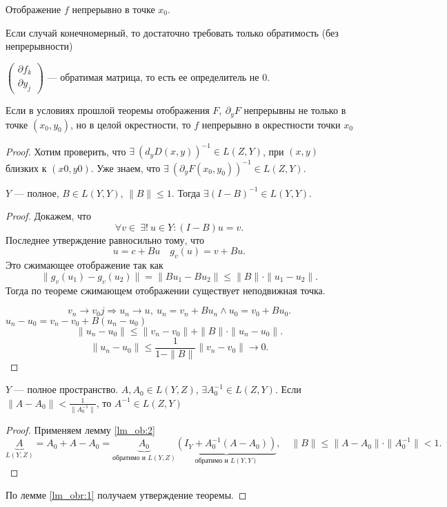 \documentclass[11pt,dvipsnames]{report}
\begin{document}
\begin{note}
    Отображение $ f$ непрерывно в точке $ x_0$.
\end{note}
\begin{note}
    Если случай конечномерный, то достаточно требовать только обратимость (без непрерывности)
\end{note}
\begin{note}
    $
    \begin{pmatrix}
        \partial f_k \\ \partial y_j
    \end{pmatrix}
    $ --- обратимая матрица,  то есть ее определитель не 0.
\end{note}
\begin{thm}
    Если в условиях прошлой теоремы отображения  $ F, ~\partial _yF$ непрерывны не только в точке $ (x_0, y_0)$, но в целой окрестности, то $ f$  непрерывно в окрестности точки  $ x_0$
\end{thm}
\begin{proof}
    Хотим проверить, что $ \exists ~ (d_y D(x, y))^{-1} \in L(Z, Y)$, при $ (x, y)$ близких к $ (x0, y0)$. Уже знаем, что $ \exists ~\left( \partial _yF(x_0, y_0) \right)^{-1} \in L(Z, Y)$.
    \begin{lm}\label{lm_ob:2}
	$ Y$ --- полное,  $ B \in L(Y, Y)$, $ \| B \|  \le  1 $. Тогда $ \exists ( I - B)^{-1} \in L(Y, Y)$.
    \end{lm}
    \begin{proof}
	Докажем, что
        \[
	    \forall v \in ~ \exists ! ~ u \in Y \colon (I-B) u = v  
        .\] 
	Последнее утверждение равносильно тому, что
	\[
	    u = c + Bu \quad g_v(u) = v + Bu
	.\] 
	Это сжимающее отображение так как
	\[
	    \|  g_v(u_1) - g_v(u_2) \| = \| Bu_1 - Bu_2 \| \le \| B \| \cdot \| u_1-u_2 \| 
	.\] 
	Тогда по теореме сжимающем отображении существует неподвижная точка.

	\[
	v_n \to  v_0j \Longrightarrow u_n \to  u, ~ u_n = v_n + B u_n \wedge  u_0  = v_0 + Bu_0
	.\] 
	$ u_n  - u_0 = v_n - v_0 + B\left( u_n - u_0 \right) $
	\[
	\| u_n - u_0 \| \le \| v_n - v_0 \| + \| B \| \cdot \|  u_n-u_0 \|    
	.\] 
	\[
	\|  u_n - u_0 \| \le \frac{1}{1-\|  B \| }  \|  v_n - v_0 \| \to  0
	.\] 
    \end{proof}
    \begin{lm}\label{lm_obr:1}
	$ Y $ --- полное пространство. $ A, A_0 \in  L(Y, Z)$, $ \exists  A_0^{-1} \in L(Z, Y)$. Если $ \| A-A_0 \| < \frac{1}{\| A_0^{-1} \| }$, то $ A^{-1} \in L(Z, Y)$ 
    \end{lm}
    \begin{proof}
	Применяем лемму \ref{lm_ob:2}
	\[
	\underbrace{A}_{L(Y, Z)} = A_0 + A - A_0 = \underbrace{A_0}_{\text{обратимо и }L(Y, Z)} \underbrace{(I_Y+A_0^{-1}(A-A_0))}_{\text{обратимо и }L(Y, Y)} , \quad \| B \| \le \| A-A_0 \| \cdot \|  A_0^{-1} \| <1 
	.\] 
    \end{proof}
    По лемме \ref{lm_obr:1} получаем утверждение теоремы.
\end{proof}
\end{document}
